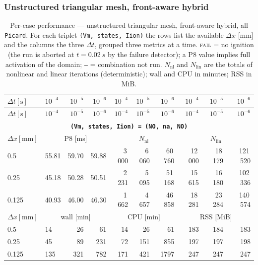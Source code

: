 \documentclass[11pt,a4paper]{article}
\newcommand{\code}[1]{\texttt{\small #1}}
\begin{document}
\subsubsection{Unstructured triangular mesh, front-aware hybrid}
\label{sec:res2d:triT}
\begin{center}\footnotesize
\begin{longtable}{l|lrr|rrr|rrr}
\caption{Per-case performance --- unstructured triangular mesh, front-aware hybrid, all \code{Picard}. For each triplet \code{(Vm, states, Iion)} the rows list the available $\Delta x$ [mm] and the columns the three $\Delta t$, grouped three metrics at a time. \textsc{fail} = no ignition (the run is aborted at $t=\SI{0.02}{s}$ by the failure detector); a P8 value implies full activation of the domain; \texttt{--} = combination not run. $N_{\mathrm{nl}}$ and $N_{\mathrm{lin}}$ are the totals of nonlinear and linear iterations (deterministic); wall and CPU in minutes; RSS in MiB.}\label{tab:res2d:triT}\\
\toprule $ \Delta t [\text{s}]$ & $10^{-4}$ & $10^{-5}$ & $10^{-6}$ & $10^{-4}$ & $10^{-5}$ & $10^{-6}$ & $10^{-4}$ & $10^{-5}$ & $10^{-6}$\\ \midrule\endfirsthead
\toprule $ \Delta t [\text{s}]$ & $10^{-4}$ & $10^{-5}$ & $10^{-6}$ & $10^{-4}$ & $10^{-5}$ & $10^{-6}$ & $10^{-4}$ & $10^{-5}$ & $10^{-6}$\\ \midrule\endhead
\multicolumn{10}{c}{\textbf{\code{(Vm, states, Iion) = (NO, na, NO)}}}\\\hline
$ \Delta x [\text{mm}] $ & \multicolumn{3}{c|}{P8 [ms]} & \multicolumn{3}{c|}{$N_{\mathrm{nl}}$} & \multicolumn{3}{c|}{$N_{\mathrm{lin}}$}\\
0.5 & 55.81 & 59.70 & 59.88 & 3\,000 & 6\,060 & 60\,760 & 12\,000 & 18\,179 & 121\,520\\
0.25 & 45.18 & 50.28 & 50.51 & 2\,231 & 5\,095 & 51\,168 & 15\,615 & 16\,180 & 102\,336\\
0.125 & 40.93 & 46.00 & 46.30 & 1\,662 & 4\,657 & 46\,858 & 18\,281 & 23\,284 & 140\,574\\
\hline
$ \Delta x [\text{mm}] $ & \multicolumn{3}{c|}{wall [min]} & \multicolumn{3}{c|}{CPU [min]} & \multicolumn{3}{c|}{RSS [MiB]}\\
0.5 & 14 & 26 & 61 & 14 & 26 & 61 & 183 & 184 & 183\\
0.25 & 45 & 89 & 231 & 72 & 151 & 855 & 197 & 197 & 198\\
0.125 & 135 & 321 & 782 & 171 & 421 & 1797 & 247 & 247 & 247\\

\end{longtable}
\end{center}
\end{document}
